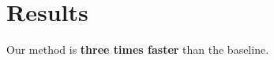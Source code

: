 \documentclass{article}
\begin{document}
\section{Results}
Our method is \textbf{three times faster} than the baseline.
\end{document}
